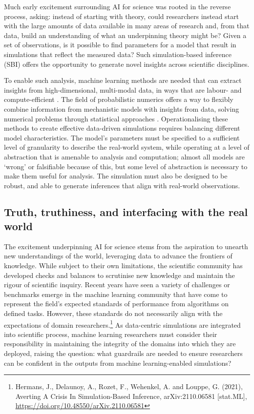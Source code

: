 Much early excitement surrounding AI for science was rooted in the
reverse process, asking: instead of starting with theory, could
researchers instead start with the large amounts of data available in
many areas of research and, from that data, build an understanding of
what an underpinning theory might be? Given a set of observations, is it
possible to find parameters for a model that result in simulations that
reflect the measured data? Such simulation-based inference (SBI) offers
the opportunity to generate novel insights across scientific
disciplines.

To enable such analysis, machine learning methods are needed that can
extract insights from high-dimensional, multi-modal data, in ways that
are labour- and compute-efficient \cite{Cranmer-frontier2020}. The field of
probabilistic numerics offers a way to flexibly combine information from
mechanistic models with insights from data, solving numerical problems
through statistical approaches \cite{Hennig-probabilistic2022}. Operationalising these methods
to create effective data-driven simulations requires balancing different
model characteristics. The model's parameters must be specified to a
sufficient level of granularity to describe the real-world system, while
operating at a level of abstraction that is amenable to analysis and
computation; almost all models are `wrong' or falsifiable because of
this, but some level of abstraction is necessary to make them useful for
analysis. The simulation must also be designed to be robust, and able to
generate inferences that align with real-world observations.

\subsection{Truth, truthiness, and interfacing with the real
world}\label{truth-truthiness-and-interfacing-with-the-real-world}

The excitement underpinning AI for science stems from the aspiration to
unearth new understandings of the world, leveraging data to advance the
frontiers of knowledge. While subject to their own limitations, the
scientific community has developed checks and balances to scrutinise new
knowledge and maintain the rigour of scientific inquiry. Recent years
have seen a variety of challenges or benchmarks emerge in the machine
learning community that have come to represent the field's expected
standards of performance from algorithms on defined tasks. However,
these standards do not necessarily align with the expectations of domain
researchers.\footnote{Hermans, J., Delaunoy, A., Rozet, F., Wehenkel, A.
  and Louppe, G. (2021), Averting A Crisis In Simulation-Based
  Inference, arXiv:2110.06581 {[}stat.ML{]},
  \href{https://doi.org/10.48550/arXiv.2110.06581}{\uline{https://doi.org/10.48550/arXiv.2110.06581}}}
As data-centric simulations are integrated into scientific process,
machine learning researchers must consider their responsibility in
maintaining the integrity of the domains into which they are deployed,
raising the question: what guardrails are needed to ensure researchers
can be confident in the outputs from machine learning-enabled
simulations?

